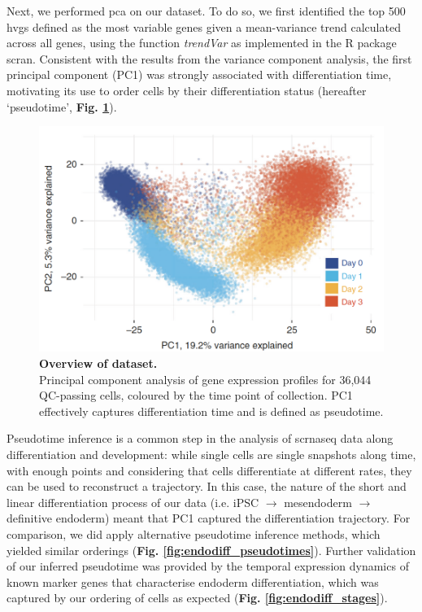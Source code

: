 Next, we performed \gls{pca} on our dataset.
To do so, we first identified the top 500 \gls{hvgs} defined as the most variable genes given a mean-variance trend calculated across all genes, using the function \textit{trendVar} as implemented in the R package scran.
Consistent with the results from the variance component analysis, the first principal component (PC1) was strongly associated with differentiation time, motivating its use to order cells by their differentiation status (hereafter `pseudotime', \textbf{Fig. \ref{fig:endodiff_pca}}).\\

\begin{figure}[h]
\centering
\includegraphics[width=14cm]{Chapter4/Fig/endodiff_pca_overview.png}
\caption[Overview of dataset.]{\textbf{Overview of dataset.}\\
Principal component analysis of gene expression profiles for 36,044 QC-passing
cells, coloured by the time point of collection.
PC1 effectively captures differentiation time and is defined as pseudotime.}
\label{fig:endodiff_pca}
\end{figure}

Pseudotime inference is a common step in the analysis of \gls{scrnaseq} data along differentiation and development: while single cells are single snapshots along time, with enough points and considering that cells differentiate at different rates, they can be used to reconstruct a trajectory.
In this case, the nature of the short and linear differentiation process of our data (i.e. iPSC $\rightarrow$ mesendoderm $\rightarrow$ definitive endoderm) meant that PC1 captured the differentiation trajectory.
For comparison, we did apply alternative pseudotime inference methods, which yielded similar orderings (\textbf{Fig. \ref{fig:endodiff_pseudotimes}}).
Further validation of our inferred pseudotime was provided by the temporal expression dynamics of known marker genes that characterise endoderm differentiation, which was captured by our ordering of cells as expected (\textbf{Fig. \ref{fig:endodiff_stages}}).

